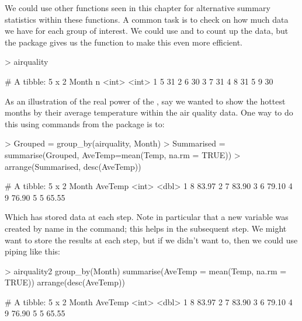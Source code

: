 We could use other functions seen in this chapter for alternative summary statistics within these functions. A common task is to check on how much data we have for each group of interest. We could use  and  to count up the data, but the  package gives us the  function to make this even more efficient. 
\begin{Schunk}
\begin{Sinput}
> airquality%>% count(Month) 
\end{Sinput}
\begin{Soutput}
# A tibble: 5 x 2
  Month     n
  <int> <int>
1     5    31
2     6    30
3     7    31
4     8    31
5     9    30
\end{Soutput}
\end{Schunk}
 
 
As an illustration of the real power of the , say we wanted to show the hottest months by their average temperature within the air quality data. One way to do this using commands from the  package is to: 
\begin{Schunk}
\begin{Sinput}
> Grouped = group_by(airquality, Month) 
> Summarised = summarise(Grouped, AveTemp=mean(Temp, na.rm = TRUE)) 
> arrange(Summarised, desc(AveTemp)) 
\end{Sinput}
\begin{Soutput}
# A tibble: 5 x 2
  Month AveTemp
  <int>   <dbl>
1     8   83.97
2     7   83.90
3     6   79.10
4     9   76.90
5     5   65.55
\end{Soutput}
\end{Schunk}
Which has stored data at each step. Note in particular that a new variable was created by name in the  command; this helps in the subsequent  step. We might want to store the results at each step, but if we didn't want to, then we could use piping like this: 
\begin{Schunk}
\begin{Sinput}
> airquality2 %>% 
   group_by(Month) %>% 
   summarise(AveTemp = mean(Temp, na.rm = TRUE))  %>% 
   arrange(desc(AveTemp)) 
\end{Sinput}
\begin{Soutput}
# A tibble: 5 x 2
  Month AveTemp
  <int>   <dbl>
1     8   83.97
2     7   83.90
3     6   79.10
4     9   76.90
5     5   65.55
\end{Soutput}
\end{Schunk}
 

